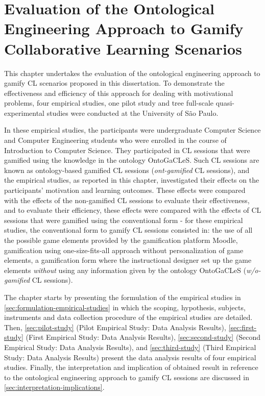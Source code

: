 \chapter[Evaluation of the Ontological Engineering Approach to Gamify CL Scenarios]
{Evaluation of the Ontological Engineering Approach to Gamify Collaborative Learning Scenarios}
\label{chapter:evaluation}

This chapter undertakes the evaluation of the ontological engineering approach to gamify CL scenarios proposed in this dissertation.
To demonstrate the effectiveness and efficiency of this approach for dealing with motivational problems, four empirical studies, one pilot study and tree full-scale quasi-experimental studies were conducted at the University of São Paulo.

In these empirical studies, the participants were undergraduate Computer Science and Computer Engineering students who were enrolled in the course of Introduction to Computer Science.
They participated in CL sessions that were gamified using the knowledge in the ontology OntoGaCLeS.
Such CL sessions are known as ontology-based gamified CL sessions (\emph{ont-gamified} CL sessions), and the empirical studies, as reported in this chapter, investigated their effects on the participants' motivation and learning outcomes.
These effects were compared with the effects of the non-gamified CL sessions to evaluate their effectiveness, and to evaluate their efficiency, these effects were compared with the effects of CL sessions that were gamified using the conventional form - for these empirical studies, the conventional form to gamify CL sessions consisted in: the use of all the possible game elements provided by the gamification platform Moodle, gamification using one-size-fits-all approach without personalization of game elements, a gamification form where the instructional designer set up the game elements \emph{without} using any information given by the ontology OntoGaCLeS (\emph{w/o-gamified} CL sessions).

The chapter starts by presenting the formulation of the empirical studies in \autoref{sec:formulation-empirical-studies} in which the scoping, hypothesis, subjects, instruments and data collection procedure of the empirical studies are detailed.
Then, \autoref{sec:pilot-study} (Pilot Empirical Study: Data Analysis Results), \autoref{sec:first-study} (First Empirical Study: Data Analysis Results), \autoref{sec:second-study} (Second Empirical Study: Data Analysis Results), and \autoref{sec:third-study} (Third Empirical Study: Data Analysis Results) present the data analysis results of four empirical studies.
Finally, the interpretation and implication of obtained result in reference to the ontological engineering approach to gamify CL sessions are discussed in \autoref{sec:interpretation-implications}.

